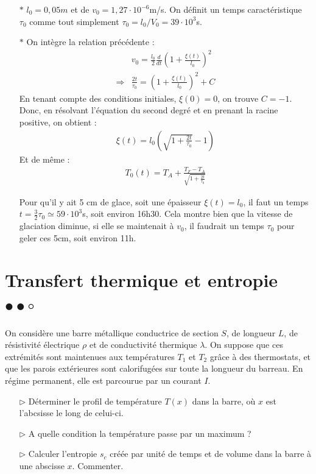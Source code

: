 \documentclass{report}
\begin{document}
\begin{itemize}
	\item[$\ast$] $l_0= 0,05m$ et de $v_0=1,27\cdot10^{-6}$m/s. On définit un temps caractéristique $\tau_0$ comme tout simplement $\tau_0=l_0/V_0=39\cdot10^{3}$s.
	
	\item[$\ast$] On intègre la relation précédente :
	\begin{align*}
			&v_0=\frac{l_0}{2}\frac{d}{dt}\left(1+\frac{\xi(t)}{l_0} \right)^2 \\
			\Rightarrow & \frac{2t}{\tau_0}=\left(1+\frac{\xi(t)}{l_0} \right)^2+C
	\end{align*}
	En tenant compte des conditions initiales, $\xi(0)=0$, on trouve $C=-1$.
	Donc, en résolvant l'équation du second degré et en prenant la racine positive, on obtient :
	\begin{align*}
		\xi(t) = l_0\left( \sqrt{1+\frac{2t}{\tau_0}}-1\right) 
	\end{align*}
	Et de même : 
	\begin{align*}
		T_0(t)=T_A+\frac{T_F-T_A}{\sqrt{1+\frac{2t}{\tau_0}}}
	\end{align*}
	
	Pour qu'il y ait 5 cm de glace, soit une épaisseur $\xi(t)=l_0$, il faut un temps $t=\frac{3}{2}\tau_0\simeq59\cdot10^{3}$s, soit environ 16h30. Cela montre bien que la vitesse de glaciation diminue, si elle se maintenait à $v_0$, il faudrait un temps $\tau_0$ pour geler ces 5cm, soit environ 11h. 

\end{itemize}

\newpage

\section*{Transfert thermique et entropie $\bullet\bullet\circ$}

On considère une barre métallique conductrice de section $S$, de longueur $L$, de résistivité électrique $\rho$ et de conductivité thermique $\lambda$. On suppose que ces extrémités sont maintenues aux températures $T_1$ et $T_2$ grâce à des thermostats, et que les parois extérieures sont calorifugées sur toute la longueur du barreau. En régime permanent, elle est parcourue par un courant $I$.

\begin{itemize}

	\item[$\triangleright$] Déterminer le profil de température $T(x)$ dans la barre, où $x$ est l'abcsisse le long de celui-ci.
	
	\item[$\triangleright$] A quelle condition la température passe par un maximum ? 
	
	\item[$\triangleright$] Calculer l'entropie $s_c$ créée par unité de temps et de volume dans la barre à une abscisse $x$. Commenter.

\end{itemize}
\end{document}

